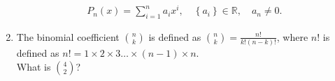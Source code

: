 \begin{enumerate}
{        \begin{answer}
          \begin{align*}
						P_{n}\left( x \right)=\sum_{i=1}^{n}a_{i}x^{i},\quad \left\{ a_{i} \right\}\in\mathbb{R},\quad a_{n}\neq0.
          \end{align*}
        \end{answer}
}\fi

  \item The binomial coefficient $\binom{n}{k}$ is defined as $\binom{n}{k}=\frac{n!}{k!(n-k)!}$, where $n!$ is defined as $n!=1\times2\times3\dots\times \left( n-1 \right)\times n$.\\
        What is $\binom{4}{2}$? 
        \if{}\fi
  

\end{enumerate}
